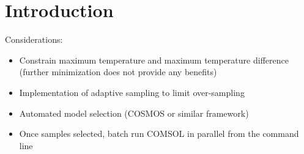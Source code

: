 \documentclass[12pt]{article}
\begin{document}

\section{Introduction}
\label{sec:intro}
Considerations: 
\begin{itemize}
	\item Constrain maximum temperature and maximum temperature difference (further minimization does not provide any benefits)
	\item Implementation of adaptive sampling to limit over-sampling
	\item Automated model selection (COSMOS or similar framework)
	\item Once samples selected, batch run COMSOL in parallel from the command line
\end{itemize}

\clearpage
\begin{multicols}{2}
	\begin{scriptsize}
		\begin{singlespace}
			
			
		\end{singlespace}
	\end{scriptsize}
\end{multicols}
%	
	
\end{document}
